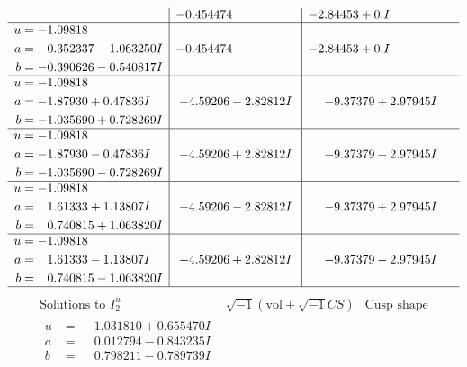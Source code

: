 \documentclass[1p]{elsarticle_modified}
\theoremstyle{definition}
\newcommand{\I}{\sqrt{-1}}
\begin{document}
$$\begin{array}{c|c|c}
 & -0.454474\phantom{ +0.000000I} & -2.84453 + 0. I\phantom{ +0.000000I} \\ \hline\begin{aligned}
u &= -1.09818\phantom{ +0.000000I} \\
a &= -0.352337 - 1.063250 I \\
b &= -0.390626 - 0.540817 I\end{aligned}
 & -0.454474\phantom{ +0.000000I} & -2.84453 + 0. I\phantom{ +0.000000I} \\ \hline\begin{aligned}
u &= -1.09818\phantom{ +0.000000I} \\
a &= -1.87930 + 0.47836 I \\
b &= -1.035690 + 0.728269 I\end{aligned}
 & -4.59206 - 2.82812 I & -9.37379 + 2.97945 I \\ \hline\begin{aligned}
u &= -1.09818\phantom{ +0.000000I} \\
a &= -1.87930 - 0.47836 I \\
b &= -1.035690 - 0.728269 I\end{aligned}
 & -4.59206 + 2.82812 I & -9.37379 - 2.97945 I \\ \hline\begin{aligned}
u &= -1.09818\phantom{ +0.000000I} \\
a &= \phantom{-}1.61333 + 1.13807 I \\
b &= \phantom{-}0.740815 + 1.063820 I\end{aligned}
 & -4.59206 - 2.82812 I & -9.37379 + 2.97945 I \\ \hline\begin{aligned}
u &= -1.09818\phantom{ +0.000000I} \\
a &= \phantom{-}1.61333 - 1.13807 I \\
b &= \phantom{-}0.740815 - 1.063820 I\end{aligned}
 & -4.59206 + 2.82812 I & -9.37379 - 2.97945 I\\
 \hline 
 \end{array}$$\newpage$$\begin{array}{c|c|c}  
\text{Solutions to }I^u_{2}& \I (\text{vol} + \sqrt{-1}CS) & \text{Cusp shape}\\
 \hline 
\begin{aligned}
u &= \phantom{-}1.031810 + 0.655470 I \\
a &= \phantom{-}0.012794 - 0.843235 I \\
b &= \phantom{-}0.798211 - 0.789739 I\end{aligned}

\end{array}$$
\end{document}
